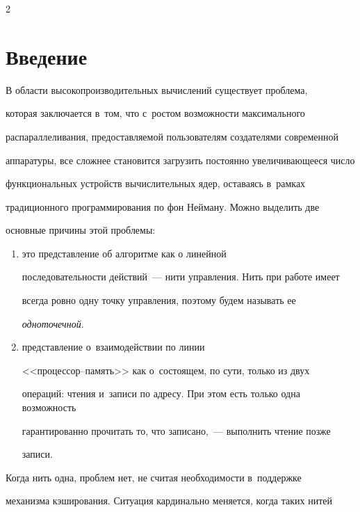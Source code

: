 \begin{multicols}{2}



\label{st\stat}

  

\section{Введение}



  В области высокопроизводительных вычислений существует проблема, 

которая заключается в~том, что с~ростом возможности максимального 

распараллеливания, предоставляемой пользователям создателями современной 

аппаратуры, все сложнее становится загрузить постоянно увеличивающееся число 

функциональных устройств вы\-чис\-ли\-тельных ядер, оставаясь в~рамках 

традиционного программирования по фон Нейману. Можно выделить две 

основные причины этой проблемы:

 \begin{enumerate}[(1)] 

\item это представление об алгоритме как о линейной 

последовательности действий~--- нити управления. Нить при работе имеет 

всегда ровно одну точку управления, поэтому будем называть ее 

\textit{одноточечной}.

  \item представление о~взаимодействии по линии  

<<про\-цес\-сор--па\-мять>> как о~состоящем, по сути, только из двух 

операций: чтения и~записи по адресу. При этом есть только одна возможность 

гарантированно прочитать то, что записано,~--- выполнить чтение позже 

записи.

\end{enumerate}



 Когда нить одна, проблем нет, не считая необходимости в~поддержке 

механизма кэширования. Ситуация кардинально меняется, когда таких нитей 


\end{multicols}
